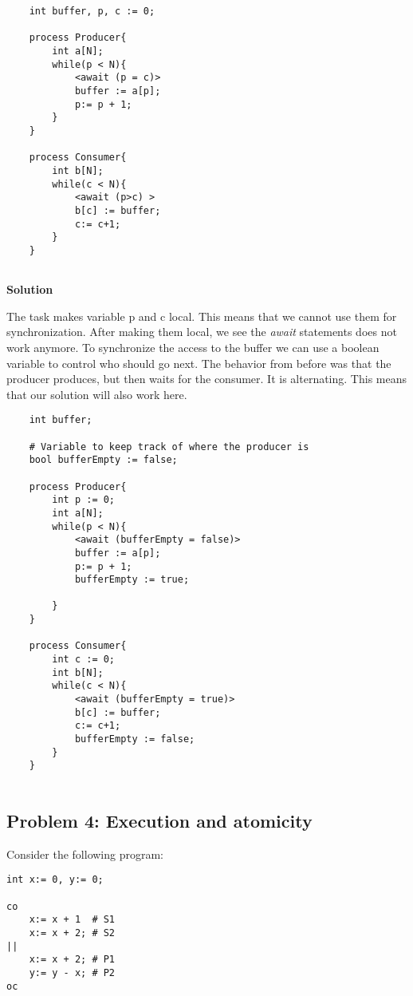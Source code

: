 \begin{lstlisting}
    int buffer, p, c := 0;

    process Producer{
        int a[N];
        while(p < N){
            <await (p = c)>
            buffer := a[p];
            p:= p + 1;
        }
    }

    process Consumer{
        int b[N];
        while(c < N){
            <await (p>c) >
            b[c] := buffer;
            c:= c+1;
        }
    }
    
\end{lstlisting}

\textbf{Solution}

The task makes variable p and c local. This means that we cannot use them for synchronization. 
After making them local, we see the \textit{await} statements does not work anymore. 
To synchronize the access to the buffer we can use a boolean variable to control who should go next. 
The behavior from before was that the producer produces, but then waits for the consumer. It is alternating.
This means that our solution will also work here. 


\begin{lstlisting}
    int buffer; 

    # Variable to keep track of where the producer is 
    bool bufferEmpty := false; 

    process Producer{
        int p := 0;
        int a[N];
        while(p < N){
            <await (bufferEmpty = false)>
            buffer := a[p];
            p:= p + 1;
            bufferEmpty := true; 
        
        }
    }

    process Consumer{
        int c := 0; 
        int b[N];
        while(c < N){
            <await (bufferEmpty = true)>
            b[c] := buffer;
            c:= c+1;
            bufferEmpty := false; 
        }
    }
    
\end{lstlisting}


\subsection{Problem 4: Execution and atomicity}

Consider the following program:

\begin{lstlisting}
int x:= 0, y:= 0;

co 
    x:= x + 1  # S1
    x:= x + 2; # S2
||
    x:= x + 2; # P1
    y:= y - x; # P2
oc 
\end{lstlisting}


